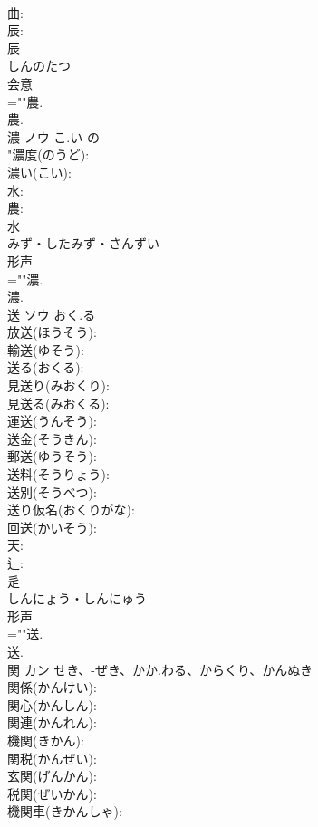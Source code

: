 \documentclass[8pt]{extreport}
\begin{document}
\begin{CJK}{UTF8}{min}
\\	曲: 
\\	辰: 
\\	辰	
\\	しんのたつ	
\\	会意 
\\	=""農.
\\	農.
\\	濃	ノウ	こ.い	の	
\\	"濃度(のうど): 
\\	濃い(こい): 
\\	水: 
\\	農: 
\\	水	
\\	みず・したみず・さんずい	
\\	形声 
\\	=""濃.
\\	濃.
\\	送	ソウ	おく.る		
\\	放送(ほうそう): 
\\	輸送(ゆそう): 
\\	送る(おくる): 
\\	見送り(みおくり): 
\\	見送る(みおくる): 
\\	運送(うんそう): 
\\	送金(そうきん): 
\\	郵送(ゆうそう): 
\\	送料(そうりょう): 
\\	送別(そうべつ): 
\\	送り仮名(おくりがな): 
\\	回送(かいそう): 
\\	天: 
\\	辶: 
\\	辵	
\\	しんにょう・しんにゅう	
\\	形声 
\\	=""送.
\\	送.
\\	関	カン	せき、-ぜき、かか.わる、からくり、かんぬき		
\\	関係(かんけい): 
\\	関心(かんしん): 
\\	関連(かんれん): 
\\	機関(きかん): 
\\	関税(かんぜい): 
\\	玄関(げんかん): 
\\	税関(ぜいかん): 
\\	機関車(きかんしゃ): 

\end{CJK}
\end{document}
